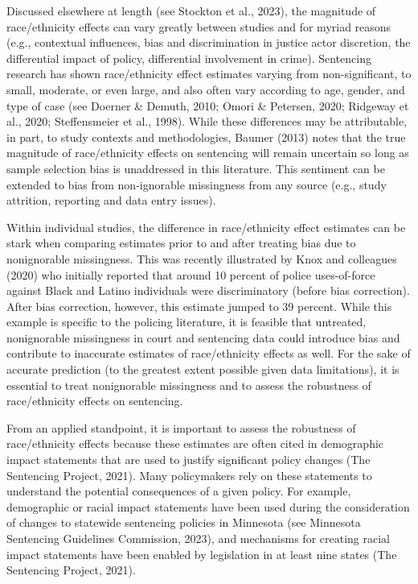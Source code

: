 \documentclass[
  letterpaper,
  DIV=11,
  numbers=noendperiod]{scrartcl}
\begin{document}
Discussed elsewhere at length (see Stockton et al., 2023), the magnitude
of race/ethnicity effects can vary greatly between studies and for
myriad reasons (e.g., contextual influences, bias and discrimination in
justice actor discretion, the differential impact of policy,
differential involvement in crime). Sentencing research has shown
race/ethnicity effect estimates varying from non-significant, to small,
moderate, or even large, and also often vary according to age, gender,
and type of case (see Doerner \& Demuth, 2010; Omori \& Petersen, 2020;
Ridgeway et al., 2020; Steffensmeier et al., 1998). While these
differences may be attributable, in part, to study contexts and
methodologies, Baumer (2013) notes that the true magnitude of
race/ethnicity effects on sentencing will remain uncertain so long as
sample selection bias is unaddressed in this literature. This sentiment
can be extended to bias from non-ignorable missingness from any source
(e.g., study attrition, reporting and data entry issues).

Within individual studies, the difference in race/ethnicity effect
estimates can be stark when comparing estimates prior to and after
treating bias due to nonignorable missingness. This was recently
illustrated by Knox and colleagues (2020) who initially reported that
around 10 percent of police uses-of-force against Black and Latino
individuals were discriminatory (before bias correction). After bias
correction, however, this estimate jumped to 39 percent. While this
example is specific to the policing literature, it is feasible that
untreated, nonignorable missingness in court and sentencing data could
introduce bias and contribute to inaccurate estimates of race/ethnicity
effects as well. For the sake of accurate prediction (to the greatest
extent possible given data limitations), it is essential to treat
nonignorable missingness and to assess the robustness of race/ethnicity
effects on sentencing.

From an applied standpoint, it is important to assess the robustness of
race/ethnicity effects because these estimates are often cited in
demographic impact statements that are used to justify significant
policy changes (The Sentencing Project, 2021). Many policymakers rely on
these statements to understand the potential consequences of a given
policy. For example, demographic or racial impact statements have been
used during the consideration of changes to statewide sentencing
policies in Minnesota (see Minnesota Sentencing Guidelines Commission,
2023), and mechanisms for creating racial impact statements have been
enabled by legislation in at least nine states (The Sentencing Project,
2021).
\end{document}
